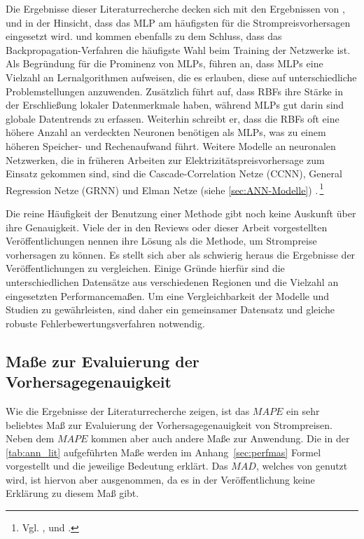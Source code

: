 Die Ergebnisse dieser Literaturrecherche decken sich mit den Ergebnissen von \citet{Aggarwal2009}, \citet{Weron2014} und \citet{Panapakidis2016} in der Hinsicht, dass das MLP am häufigsten für die Strompreisvorhersagen eingesetzt wird. \citet{Aggarwal2009} und \citet{Weron2014} kommen ebenfalls zu dem Schluss, dass das Backpropagation-Verfahren die häufigste Wahl beim Training der Netzwerke ist. Als Begründung für die Prominenz von MLPs, führen \citet{Panapakidis2016} an, dass MLPs eine Vielzahl an Lernalgorithmen aufweisen, die es erlauben, diese auf unterschiedliche Problemstellungen anzuwenden. Zusätzlich führt \citet{Weron2014} auf, dass RBFs ihre Stärke in der Erschließung lokaler Datenmerkmale haben, während MLPs gut darin sind globale Datentrends zu erfassen. Weiterhin schreibt er, dass die RBFs oft eine höhere Anzahl an verdeckten Neuronen benötigen als MLPs, was zu einem höheren Speicher- und Rechenaufwand führt. 
Weitere Modelle an neuronalen Netzwerken, die in früheren Arbeiten zur Elektrizitätspreisvorhersage zum Einsatz gekommen sind, sind die Cascade-Correlation Netze (CCNN), General Regression Netze (GRNN) und Elman Netze (siehe \autoref{sec:ANN-Modelle}) .\,\footnote{Vgl. \citet[757]{Cerjan2013}, \citet[28 ff]{Weron2014} und \citet[134]{Panapakidis2016}.}

Die reine Häufigkeit der Benutzung einer Methode gibt noch keine Auskunft über ihre Genauigkeit. Viele der in den Reviews oder dieser Arbeit vorgestellten Veröffentlichungen nennen ihre Lösung als die Methode, um Strompreise vorhersagen zu können. Es stellt sich aber als schwierig heraus die Ergebnisse der Veröffentlichungen zu vergleichen. Einige Gründe hierfür sind die unterschiedlichen Datensätze aus verschiedenen Regionen und die Vielzahl an eingesetzten Performancemaßen. Um eine Vergleichbarkeit der Modelle und Studien zu gewährleisten, sind daher ein gemeinsamer Datensatz und gleiche robuste Fehlerbewertungsverfahren notwendig.\, %

\subsection{Maße zur Evaluierung der Vorhersagegenauigkeit}\label{sec:eval_maße}

Wie die Ergebnisse der Literaturrecherche zeigen, ist das $MAPE$ ein sehr beliebtes Maß zur Evaluierung der Vorhersagegenauigkeit von Strompreisen. Neben dem $MAPE$ kommen aber auch andere Maße zur Anwendung. Die in der \autoref{tab:ann_lit} aufgeführten Maße werden im Anhang~\ref{sec:perfmas} Formel vorgestellt und die jeweilige Bedeutung erklärt. Das $MAD$, welches von \citet{Keles2016} genutzt wird, ist hiervon aber ausgenommen, da es in der Veröffentlichung keine Erklärung zu diesem Maß gibt.

